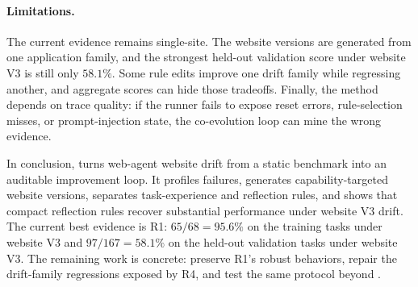 \paragraph{Limitations.}
The current evidence remains single-site. The website versions are generated from one application family, and the strongest held-out validation score under website V3 is still only \(58.1\%\). Some rule edits improve one drift family while regressing another, and aggregate scores can hide those tradeoffs. Finally, the method depends on trace quality: if the runner fails to expose reset errors, rule-selection misses, or prompt-injection state, the co-evolution loop can mine the wrong evidence.

In conclusion, \webcoevo{} turns web-agent website drift from a static benchmark into an auditable improvement loop. It profiles failures, generates capability-targeted \linkding{} website versions, separates task-experience and reflection rules, and shows that compact reflection rules recover substantial performance under website V3 drift. The current best evidence is R1: \(65/68=95.6\%\) on the training tasks under website V3 and \(97/167=58.1\%\) on the held-out validation tasks under website V3. The remaining work is concrete: preserve R1's robust behaviors, repair the drift-family regressions exposed by R4, and test the same protocol beyond \linkding{}.
